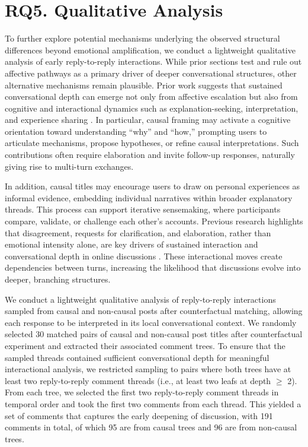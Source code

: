 \documentclass[acmsmall]{acmart}
\begin{document}
\section{RQ5. Qualitative Analysis}

To further explore potential mechanisms underlying the observed structural differences beyond emotional amplification, we conduct a lightweight qualitative analysis of early reply-to-reply interactions. While prior sections test and rule out affective pathways as a primary driver of deeper conversational structures, other alternative mechanisms remain plausible. Prior work suggests that sustained conversational depth can emerge not only from affective escalation but also from cognitive and interactional dynamics such as explanation-seeking, interpretation, and experience sharing \cite{lombrozo2006structure, graesser1994constructing, zhang2018characterizing}. In particular, causal framing may activate a cognitive orientation toward understanding “why” and “how,” prompting users to articulate mechanisms, propose hypotheses, or refine causal interpretations. Such contributions often require elaboration and invite follow-up responses, naturally giving rise to multi-turn exchanges.

In addition, causal titles may encourage users to draw on personal experiences as informal evidence, embedding individual narratives within broader explanatory threads. This process can support iterative sensemaking, where participants compare, validate, or challenge each other’s accounts. Previous research highlights that disagreement, requests for clarification, and elaboration, rather than emotional intensity alone, are key drivers of sustained interaction and conversational depth in online discussions \cite{danescu2013computational, kumar2010dynamics}. These interactional moves create dependencies between turns, increasing the likelihood that discussions evolve into deeper, branching structures.



We conduct a lightweight qualitative analysis of reply-to-reply interactions sampled from causal and non-causal posts after counterfactual matching, allowing each response to be interpreted in its local conversational context.  We randomly selected 30 matched pairs of causal and non-causal post titles after counterfactual experiment and extracted their associated comment trees. To ensure that the sampled threads contained sufficient conversational depth for meaningful interactional analysis, we restricted sampling to pairs where both trees have at least two reply-to-reply comment threads (i.e., at least two leafs at depth $\geq$ 2). From each tree, we selected the first two reply-to-reply comment threads in temporal order and took the first two comments from each thread. This yielded a set of comments that captures the early deepening of discussion, with 191 comments in total, of which 95 are from causal trees and 96 are from non-causal trees.
\end{document}
